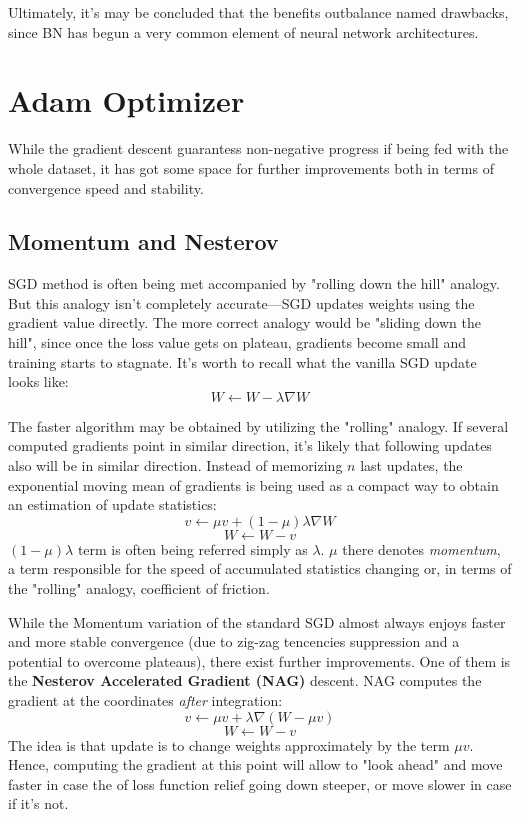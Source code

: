 \documentclass[thesis=B,english]{FITthesis}[2019/12/23]
\begin{document}
Ultimately, it's may be concluded that the benefits outbalance named drawbacks, since BN has begun a very common element of neural network architectures.

\section{Adam Optimizer}

While the gradient descent guarantess non-negative progress if being fed with the whole dataset, it has got some space for further improvements both in terms of convergence speed and stability.

\subsection{Momentum and Nesterov}

SGD method is often being met accompanied by "rolling down the hill" analogy. But this analogy isn't completely accurate---SGD updates weights using the gradient value directly. The more correct analogy would be "sliding down the hill", since once the loss value gets on plateau, gradients become small and training starts to stagnate. It's worth to recall what the vanilla SGD update looks like:
\[W \longleftarrow W - \lambda \nabla W\]

The faster algorithm\cite{learning_representations} may be obtained by utilizing the "rolling" analogy. If several computed gradients point in similar direction, it's likely that following updates also will be in similar direction. Instead of memorizing $n$ last updates, the exponential moving mean of gradients is being used as a compact way to obtain an estimation of update statistics:
\[v \longleftarrow \mu v + (1 - \mu) \lambda \nabla W\]
\[W \longleftarrow W - v\]
$(1 - \mu) \lambda$ term is often being referred simply as $\lambda$. $\mu$ there denotes \textit{momentum}, a term responsible for the speed of accumulated statistics changing or, in terms of the "rolling" analogy, coefficient of friction.

While the Momentum variation of the standard SGD almost always enjoys faster and more stable convergence (due to zig-zag tencencies suppression and a potential to overcome plateaus), there exist further improvements. One of them is the \textbf{Nesterov Accelerated Gradient (NAG)}\cite{nesterov} descent. NAG computes the gradient at the coordinates \textit{after} integration:
\[v \longleftarrow \mu v + \lambda \nabla (W - \mu v)\]
\[W \longleftarrow W - v\]
The idea is that update is to change weights approximately by the term $\mu v$. Hence, computing the gradient at this point will allow to "look ahead" and move faster in case the of loss function relief going down steeper, or move slower in case if it's not.
\end{document}

